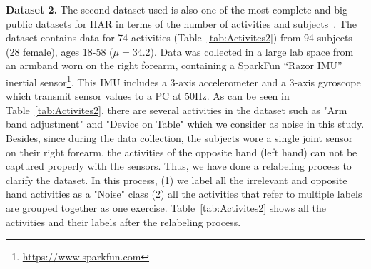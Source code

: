 \documentclass[sensors,article,submit,moreauthors,pdftex]{Definitions/mdpi}
\begin{document}
\noindent\textbf{Dataset 2.} \label{sec:dataset2}
The second dataset used is also one of the most complete and big public datasets for HAR in terms of the number of activities and subjects~\cite{morris2014recofit}. The dataset contains data for 74 activities (Table~\ref{tab:Activites2}) from 94 subjects (28 female), ages 18-58 ($\mu=34.2$). Data was collected in a large lab space from an armband worn on the right forearm, containing a SparkFun “Razor IMU” inertial sensor\footnote{\url{https://www.sparkfun.com}}. This IMU includes a 3-axis accelerometer and a 3-axis gyroscope which transmit sensor values to a PC at 50Hz. As can be seen in Table~\ref{tab:Activites2}, there are several activities in the dataset such as "Arm band adjustment" and "Device on Table" which we consider as noise in this study. Besides, since during the data collection, the subjects wore a single joint sensor on their right forearm, the activities of the opposite hand (left hand) can not be captured properly with the sensors. Thus, we have done a relabeling process to clarify the dataset. In this process, (1) we label all the irrelevant and opposite hand activities as a "Noise" class (2) all the activities that refer to multiple labels are grouped together as one exercise. Table~\ref{tab:Activites2} shows all the activities and their labels after the relabeling process.   
\end{document}
